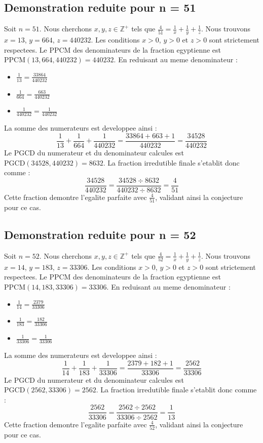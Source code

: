 \documentclass[11pt,a4paper]{article}
\begin{document}
\subsection{Demonstration reduite pour n = 51}
Soit $n = 51$. Nous cherchons $x, y, z \in \mathbb{Z}^{+}$ tels que $\frac{4}{51} = \frac{1}{x} + \frac{1}{y} + \frac{1}{z}$.
Nous trouvons $x = 13$, $y = 664$, $z = 440232$.
Les conditions $x > 0$, $y > 0$ et $z > 0$ sont strictement respectees.
Le PPCM des denominateurs de la fraction egyptienne est $\text{PPCM}(13, 664, 440232) = 440232$.
En reduisant au meme denominateur :
\begin{itemize}
    \item $\frac{1}{13} = \frac{33864}{440232}$
    \item $\frac{1}{664} = \frac{663}{440232}$
    \item $\frac{1}{440232} = \frac{1}{440232}$
\end{itemize}
La somme des numerateurs est developpee ainsi :
$$ \frac{1}{13} + \frac{1}{664} + \frac{1}{440232} = \frac{33864 + 663 + 1}{440232} = \frac{34528}{440232} $$
Le PGCD du numerateur et du denominateur calcules est $\text{PGCD}(34528, 440232) = 8632$.
La fraction irredutible finale s'etablit donc comme :
$$ \frac{34528}{440232} = \frac{34528 \div 8632}{440232 \div 8632} = \frac{4}{51} $$
Cette fraction demontre l'egalite parfaite avec $\frac{4}{51}$, validant ainsi la conjecture pour ce cas.

\subsection{Demonstration reduite pour n = 52}
Soit $n = 52$. Nous cherchons $x, y, z \in \mathbb{Z}^{+}$ tels que $\frac{4}{52} = \frac{1}{x} + \frac{1}{y} + \frac{1}{z}$.
Nous trouvons $x = 14$, $y = 183$, $z = 33306$.
Les conditions $x > 0$, $y > 0$ et $z > 0$ sont strictement respectees.
Le PPCM des denominateurs de la fraction egyptienne est $\text{PPCM}(14, 183, 33306) = 33306$.
En reduisant au meme denominateur :
\begin{itemize}
    \item $\frac{1}{14} = \frac{2379}{33306}$
    \item $\frac{1}{183} = \frac{182}{33306}$
    \item $\frac{1}{33306} = \frac{1}{33306}$
\end{itemize}
La somme des numerateurs est developpee ainsi :
$$ \frac{1}{14} + \frac{1}{183} + \frac{1}{33306} = \frac{2379 + 182 + 1}{33306} = \frac{2562}{33306} $$
Le PGCD du numerateur et du denominateur calcules est $\text{PGCD}(2562, 33306) = 2562$.
La fraction irredutible finale s'etablit donc comme :
$$ \frac{2562}{33306} = \frac{2562 \div 2562}{33306 \div 2562} = \frac{1}{13} $$
Cette fraction demontre l'egalite parfaite avec $\frac{4}{52}$, validant ainsi la conjecture pour ce cas.
\end{document}
